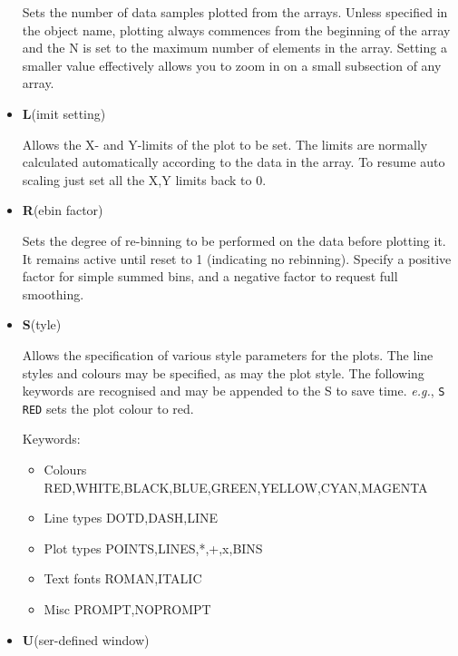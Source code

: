\documentclass[11pt,twoside]{article}
\newcommand{\sunspec}[2]{#1}
\renewcommand{\sunspec}[2]{#2}
\newcommand{\myindex}[1]{\index{#1}}
\renewcommand{\myindex}[1]{}
\begin{document}
\begin{itemize}
     Sets the number of data samples plotted from the arrays.
     Unless specified in the object name,
     plotting always commences from the beginning of the array and the N
     is set to the maximum number of elements in the array. Setting a
     smaller value effectively allows you to zoom in on a small subsection
     of any array.

\item {\sunspec{\Large\tt}{\bf} L}(imit setting)
     \myindex{Plotter!set limits}

     Allows the X- and Y-limits of the plot to be set.
     The limits are normally calculated automatically
     according to the data in the array. To resume auto scaling just set
     all the X,Y limits back to 0.

\item{\sunspec{\Large\tt}{\bf} R}(ebin factor)
     \myindex{Plotter!rebinning}
     \myindex{Re-binning!using plotter}

     Sets the degree of re-binning to be
     performed on the data before plotting it. It remains active until
     reset to 1 (indicating no rebinning). Specify a positive factor for
     simple summed bins, and a negative factor to request full smoothing.

\item{\sunspec{\Large\tt}{\bf} S}(tyle)
     \myindex{Plot styles}

     Allows the specification of various style
     parameters for the plots. The line styles and colours may be
     specified, as may the plot style. The following keywords are
     recognised and may be appended to the S to save time. {\it{e.g.}},
     \verb+S RED+ sets the plot colour to red.

     Keywords:

     \begin{itemize}

     \item {Colours} RED,WHITE,BLACK,BLUE,GREEN,YELLOW,CYAN,MAGENTA
     \item {Line types} DOTD,DASH,LINE
     \item {Plot types} POINTS,LINES,*,+,x,BINS
     \item {Text fonts} ROMAN,ITALIC
     \item {Misc} PROMPT,NOPROMPT

     \end{itemize}

\item{\sunspec{\Large\tt}{\bf} U}(ser-defined window)
     \myindex{Graphics!multiple per screen}


\end{itemize}
\end{document}
